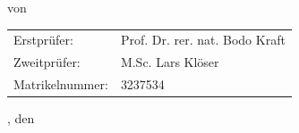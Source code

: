 \begin{titlepage}
\begin{center}
		\textbf{\Large \subjectDocument}

		\vspace*{0.5cm}
		
		{\normalsize von}
		
		\vspace*{0.5cm}
		
		\textbf{\Large \authorDocument}
	
		\vspace*{3.5cm}
		
		\begin{minipage}[t]{13cm}
			\begin{center}
				\begin{tabular}{ll}
					Erstprüfer: & Prof. Dr. rer. nat. Bodo Kraft \\
					Zweitprüfer: & M.Sc. Lars Klöser \\
					Matrikelnummer: & 3237534 \\
				\end{tabular}
			\end{center}
		\end{minipage}
		
		\vspace*{2.5cm}
	
		{\large \locationDocument, den \dateDocument}
	\end{center}
\end{titlepage}

